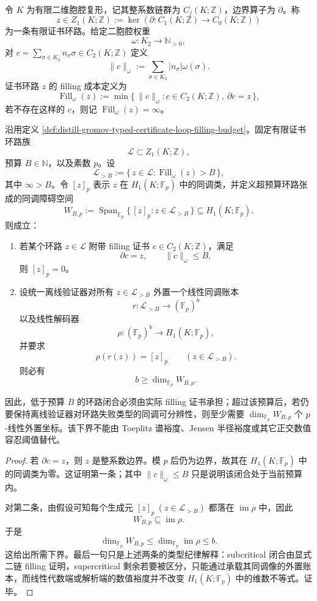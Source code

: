 \begin{definition}\label{def:distill-gromov-typed-certificate-loop-filling-budget}
令 \(K\) 为有限二维胞腔复形，记其整系数链群为 \(C_j(K;\mathbb Z)\)，边界算子为 \(\partial\)。称
\[
z\in Z_1(K;\mathbb Z):=\ker(\partial:C_1(K;\mathbb Z)\to C_0(K;\mathbb Z))
\]
为一条有限证书环路。给定二胞腔权重
\[
\omega:K_2\to\mathbb N_{>0},
\]
对 \(c=\sum_{\sigma\in K_2}n_\sigma\sigma\in C_2(K;\mathbb Z)\) 定义
\[
\|c\|_\omega:=\sum_{\sigma\in K_2}|n_\sigma|\omega(\sigma).
\]
证书环路 \(z\) 的 filling 成本定义为
\[
\operatorname{Fill}_\omega(z):=\min\{\,\|c\|_\omega:c\in C_2(K;\mathbb Z),\ \partial c=z\,\},
\]
若不存在这样的 \(c\)，则记 \(\operatorname{Fill}_\omega(z)=\infty\)。
\end{definition}

\begin{theorem}\label{thm:distill-gromov-typed-certificate-loop-filling-ledger-lower-bound}
沿用定义 \ref{def:distill-gromov-typed-certificate-loop-filling-budget}。固定有限证书环路族
\[
\mathcal L\subset Z_1(K;\mathbb Z),
\]
预算 \(B\in\mathbb N\)，以及素数 \(p\)。设
\[
\mathcal L_{>B}:=\{\,z\in\mathcal L:\operatorname{Fill}_\omega(z)>B\,\},
\]
其中 \(\infty>B\)。令 \([z]_p\) 表示 \(z\) 在 \(H_1(K;\mathbb F_p)\) 中的同调类，并定义超预算环路张成的同调障碍空间
\[
W_{B,p}:=\operatorname{Span}_{\mathbb F_p}\{\,[z]_p:z\in\mathcal L_{>B}\,\}\subseteq H_1(K;\mathbb F_p).
\]
则成立：
\begin{enumerate}
  \item 若某个环路 \(z\in\mathcal L\) 附带 filling 证书 \(c\in C_2(K;\mathbb Z)\)，满足
  \[
  \partial c=z,\qquad \|c\|_\omega\le B,
  \]
  则 \([z]_p=0\)。
  \item 设统一离线验证器对所有 \(z\in\mathcal L_{>B}\) 外置一个线性同调账本
  \[
  r:\mathcal L_{>B}\to(\mathbb F_p)^b
  \]
  以及线性解码器
  \[
  \rho:(\mathbb F_p)^b\to H_1(K;\mathbb F_p),
  \]
  并要求
  \[
  \rho(r(z))=[z]_p\qquad(z\in\mathcal L_{>B}).
  \]
  则必有
  \[
  b\ge \dim_{\mathbb F_p}W_{B,p}.
  \]
\end{enumerate}
因此，低于预算 \(B\) 的环路闭合必须由实际 filling 证书承担；超过该预算后，若仍要保持离线验证器对环路失败类型的同调可分辨性，则至少需要 \(\dim_{\mathbb F_p}W_{B,p}\) 个 \(p\)-线性外置坐标。该下界不能由 Toeplitz 谱裕度、Jensen 半径裕度或其它正交数值容忍阈值替代。
\end{theorem}
\begin{proof}
若 \(\partial c=z\)，则 \(z\) 是整系数边界。模 \(p\) 后仍为边界，故其在 \(H_1(K;\mathbb F_p)\) 中的同调类为零。这证明第一条；其中 \(\|c\|_\omega\le B\) 只是说明该闭合处于当前预算内。

对第二条，由假设可知每个生成元 \([z]_p\ (z\in\mathcal L_{>B})\) 都落在 \(\operatorname{im}\rho\) 中，因此
\[
W_{B,p}\subseteq \operatorname{im}\rho.
\]
于是
\[
\dim_{\mathbb F_p}W_{B,p}\le \dim_{\mathbb F_p}\operatorname{im}\rho\le b.
\]
这给出所需下界。最后一句只是上述两条的类型纪律解释：subcritical 闭合由显式二链 filling 证明，supercritical 剩余若要被区分，只能通过承载其同调像的外置账本，而线性代数端或解析端的数值裕度并不改变 \(H_1(K;\mathbb F_p)\) 中的维数不等式。证毕。
\end{proof}

